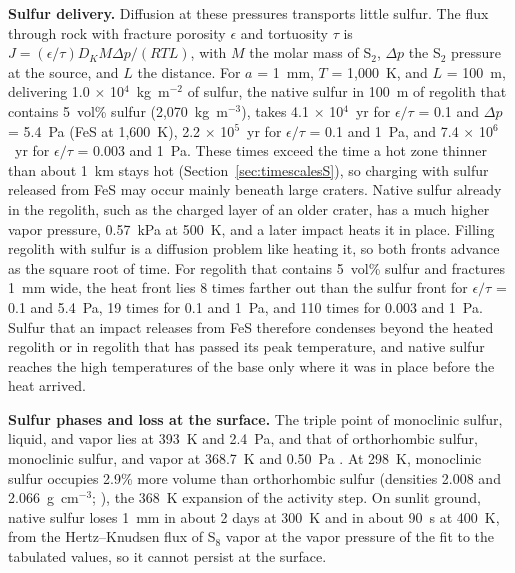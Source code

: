 \documentclass{planetary}
\begin{document}
\textbf{Sulfur delivery.} Diffusion at these pressures transports little sulfur. The flux through rock with fracture porosity $\epsilon$ and tortuosity $\tau$ is $J = (\epsilon/\tau) D_K M \Delta p/(R T L)$, with $M$ the molar mass of S$_2$, $\Delta p$ the S$_2$ pressure at the source, and $L$ the distance. For $a$ = 1~mm, $T$ = 1,000~K, and $L$ = 100~m, delivering 1.0 $\times$ 10$^4$~kg~m$^{-2}$ of sulfur, the native sulfur in 100~m of regolith that contains 5~vol\% sulfur (2,070~kg~m$^{-3}$), takes 4.1 $\times$ 10$^4$~yr for $\epsilon/\tau$ = 0.1 and $\Delta p$ = 5.4~Pa (FeS at 1,600~K), 2.2 $\times$ 10$^5$~yr for $\epsilon/\tau$ = 0.1 and 1~Pa, and 7.4 $\times$ 10$^6$~yr for $\epsilon/\tau$ = 0.003 and 1~Pa. These times exceed the time a hot zone thinner than about 1~km stays hot (Section~\ref{sec:timescalesS}), so charging with sulfur released from FeS may occur mainly beneath large craters. Native sulfur already in the regolith, such as the charged layer of an older crater, has a much higher vapor pressure, 0.57~kPa at 500~K, and a later impact heats it in place. Filling regolith with sulfur is a diffusion problem like heating it, so both fronts advance as the square root of time. For regolith that contains 5~vol\% sulfur and fractures 1~mm wide, the heat front lies 8 times farther out than the sulfur front for $\epsilon/\tau$ = 0.1 and 5.4~Pa, 19 times for 0.1 and 1~Pa, and 110 times for 0.003 and 1~Pa. Sulfur that an impact releases from FeS therefore condenses beyond the heated regolith or in regolith that has passed its peak temperature, and native sulfur reaches the high temperatures of the base only where it was in place before the heat arrived.

\textbf{Sulfur phases and loss at the surface.} The triple point of monoclinic sulfur, liquid, and vapor lies at 393~K and 2.4~Pa, and that of orthorhombic sulfur, monoclinic sulfur, and vapor at 368.7~K and 0.50~Pa \parencite{steudel2003}. At 298~K, monoclinic sulfur occupies 2.9\% more volume than orthorhombic sulfur (densities 2.008 and 2.066~g~cm$^{-3}$; \cite{steudel2003}), the 368~K expansion of the activity step. On sunlit ground, native sulfur loses 1~mm in about 2 days at 300~K and in about 90~s at 400~K, from the Hertz--Knudsen flux of S$_8$ vapor at the vapor pressure of the fit to the tabulated values, so it cannot persist at the surface.
\end{document}
